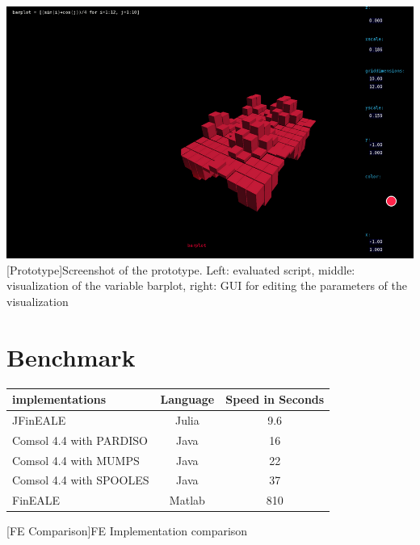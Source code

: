 \begin{appendix}
\begin{minipage}{\linewidth}
    \centering
    \includegraphics[scale=2.0]{graphics/screenshot.png}
    [Prototype]{Screenshot of the prototype. Left: evaluated script, middle: visualization of the variable barplot, right: GUI for editing the parameters of the visualization}
    \label{app:screenshot}
\end{minipage}

\section{Benchmark}

\begin{table}[htb]
    \centering
    \begin{tabular}{l|c|c}
        \hline
        implementations         & Language  & Speed in Seconds \\
        \hline
        JFinEALE                & Julia     & 9.6   \\
        Comsol 4.4 with PARDISO & Java      & 16    \\
        Comsol 4.4 with MUMPS   & Java      & 22    \\ 
        Comsol 4.4 with SPOOLES & Java      & 37    \\ 
        FinEALE                 & Matlab    & 810   \\
        \hline
    \end{tabular}
    [FE Comparison]{FE Implementation comparison}
    \label{table:FEComparison}
\end{table}




\end{appendix}

